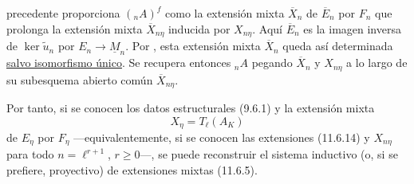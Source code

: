 
precedente proporciona $({}_nA)^f$ como la extensión
mixta $\overline X_n$ de $\overline E_n$ por $F_n$ que prolonga la
extensión mixta $\overline X_{n\eta}$ inducida por $X_{n\eta}$. Aquí
$\overline E_n$ es la imagen inversa de $\ker\widetilde u_n$ por
$E_n\longrightarrow\underline M_n$. Por , esta extensión mixta
$\overline X_n$ queda así determinada \underline{salvo isomorfismo
único}. Se recupera entonces ${}_nA$ pegando $\overline X_n$ y
$X_{n\eta}$ a lo largo de su subesquema abierto común
$\overline X_{n\eta}$.

Por tanto, si se conocen los datos estructurales (9.6.1) y la extensión
mixta
\begin{equation*}
X_\eta=T_\ell(A_K)
\end{equation*}
de $E_\eta$ por $F_\eta$ ---equivalentemente, si se conocen las
extensiones (11.6.14) y $X_{n\eta}$ para todo
$n=\ell^{r+1}$, $r\geq0$---, se puede reconstruir el sistema inductivo
(o, si se prefiere, proyectivo) de extensiones mixtas (11.6.5).
